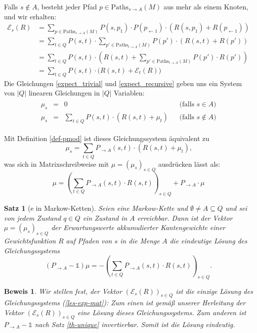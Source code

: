 \documentclass[a4paper]{article}
\newcommand{\mc}{Markow-Kette}
\newtheorem{satz}{Satz}[section] %
\theoremstyle{nonumberplain}
\newtheorem{beweis}{Beweis}
\begin{document}
	Falls $s \notin A$, besteht jeder Pfad $p \in \mathrm{Paths}_{s \rightarrow A}(M)$ aus mehr als einem Knoten, und wir erhalten:
	\begin{align}
	\mathcal{E}_{s}(R) & = \sum_{p \in \mathrm{Paths}_{s \rightarrow A}(M)}{P(s,p_1) \cdot P(p_{\leftarrow 1}) \cdot (R(s,p_1) + R(p_{\leftarrow 1}))} \\
	& = \sum_{t \in Q}{ P(s,t) \cdot \sum_{p' \in \mathrm{Paths}_{t \rightarrow A}(M)}{ P(p') \cdot (R(s,t) + R(p')) } } \\
	& = \sum_{t \in Q}{ P(s,t) \cdot \left(R(s,t) + \sum_{p' \in \mathrm{Paths}_{t \rightarrow A}(M)}{ P(p') \cdot R(p') } \right) } \\
	& = \sum_{t \in Q}{ P(s,t) \cdot \big(R(s,t) + \mathcal{E}_{t}(R) \big) } \label{expect_recursive}
	\end{align}
	Die Gleichungen \ref{expect_trivial} und \ref{expect_recursive} geben uns ein System von $|Q|$ linearen Gleichungen in $|Q|$ Variablen:
	\begin{align}
	\begin{aligned}
	\mu_{s} & = & 0 && \text{(falls $s \in A$)} \\
	\mu_{s} & = & \sum_{t \in Q}{ P(s,t) \cdot \left(R(s,t) + \mu_{t} \right) } && \text{(falls $s \notin A$)}
	\end{aligned}\label{les-exp}
	\end{align}
	
	Mit Definition \ref{def-pmod} ist dieses Gleichungssystem äquivalent zu
	\begin{equation}
	\mu_s = \sum_{t \in Q}{ P_{\rightarrow A}(s,t) \cdot \left(R(s,t) + \mu_{t} \right) }\text{,}
	\end{equation}
	was sich in Matrixschreibweise mit $\mu = (\mu_s)_{s \in Q }$ ausdrücken lässt als:
	\begin{equation}
	\mu = \left(\sum_{t \in Q}{ P_{\rightarrow A}(s,t) \cdot R(s,t) }\right)_{s \in Q} + P_{\rightarrow A} \cdot \mu 
	\end{equation}
	\begin{satz}[\expect{}e in \mc{}n]\label{th-exp}
		Seien \mcex{} eine \mc{} und $\emptyset \neq A\subseteq Q$ und sei von jedem Zustand $q\in Q$ ein Zustand in $A$ erreichbar. Dann ist der Vektor $\mu = (\mu_s)_{s \in Q }$ der Erwartungswerte akkumulierter Kantengewichte einer Gewichtsfunktion $R$ auf Pfaden von $s$ in die Menge $A$ die eindeutige Lösung des Gleichungssystems	
		\begin{equation}
		(P_{\rightarrow A} - \mathbb{1}) \mu = - \left(\sum_{t \in Q}{ P_{\rightarrow A}(s,t) \cdot R(s,t) }\right)_{s \in Q}\text{.}\label{les-exp-mat}
		\end{equation}
	\end{satz}
	\begin{beweis}
		Wir stellen fest, der Vektor $(\mathcal{E}_{s}(R))_{s \in Q}$ ist die einzige Lösung des Gleichungssystems (\ref{les-exp-mat}):
		Zum einen ist gemäß unserer Herleitung der Vektor $(\mathcal{E}_{s}(R))_{s \in Q}$ eine Lösung dieses Gleichungssystems. Zum anderen ist $P_{\rightarrow A} - \mathbb{1}$ nach Satz \ref{th-unique} invertierbar. Somit ist die Lösung eindeutig.
	\end{beweis}
	
\end{document}
